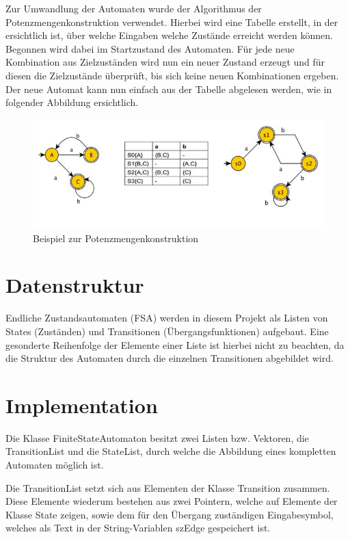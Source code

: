 Zur Umwandlung der Automaten wurde der Algorithmus der Potenzmengenkonstruktion verwendet. Hierbei wird eine Tabelle erstellt, in der ersichtlich ist, \"uber welche Eingaben welche Zust\"ande erreicht werden k\"onnen. Begonnen wird dabei im Startzustand des Automaten. F\"ur jede neue Kombination aus Zielzust\"anden wird nun ein neuer Zustand erzeugt und f\"ur diesen die Zielzust\"ande \"uberpr\"uft, bis sich keine neuen Kombinationen ergeben. Der neue Automat kann nun einfach aus der Tabelle abgelesen werden, wie in folgender Abbildung ersichtlich.

\begin{figure}[h]
 \centering
 \includegraphics[keepaspectratio, scale=0.89]{objectsToInclude/Potenzmengenkonstruktion.jpg}
 \caption{Beispiel zur Potenzmengenkonstruktion}
\label{fig:FSA_PMK}
\end{figure}

\section{Datenstruktur} 

Endliche Zustandsautomaten (FSA) werden in diesem Projekt als Listen von States (Zust\"anden) und Transitionen (\"Ubergangsfunktionen) aufgebaut. Eine gesonderte Reihenfolge der Elemente einer Liste ist hierbei nicht zu beachten, da die Struktur des Automaten durch die einzelnen Transitionen abgebildet wird.

\section{Implementation}
Die Klasse FiniteStateAutomaton besitzt zwei Listen bzw. Vektoren, die TransitionList und die StateList, durch welche die Abbildung eines kompletten Automaten m\"oglich ist.

Die TransitionList setzt sich aus Elementen der Klasse Transition zusammen. Diese Elemente wiederum bestehen aus zwei Pointern, welche auf Elemente der Klasse State zeigen, sowie dem f\"ur den \"Ubergang zust\"andigen Eingabesymbol, welches als Text in der String-Variablen szEdge gespeichert ist.


